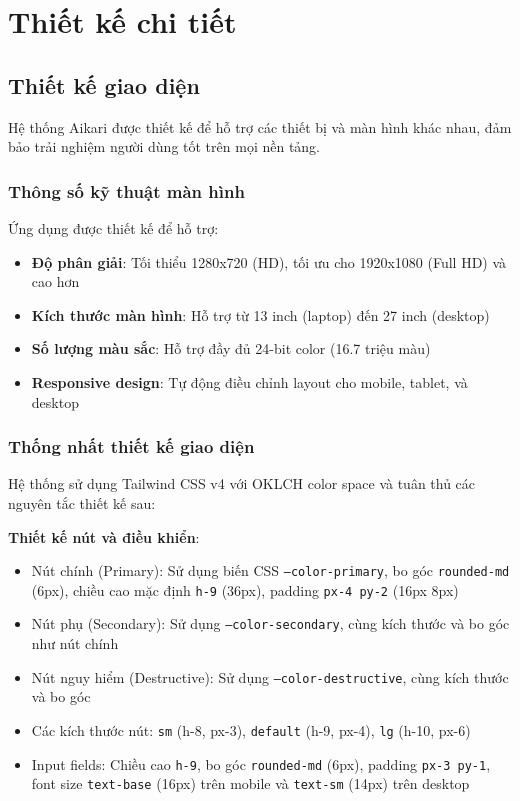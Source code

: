 \documentclass[../DoAn.tex]{subfiles}
\begin{document}
\section{Thiết kế chi tiết}
\label{section:4.2}

\subsection{Thiết kế giao diện}
\label{subsection:4.2.1}

Hệ thống Aikari được thiết kế để hỗ trợ các thiết bị và màn hình khác nhau, đảm bảo trải nghiệm người dùng tốt trên mọi nền tảng.

\subsubsection{Thông số kỹ thuật màn hình}

Ứng dụng được thiết kế để hỗ trợ:
\begin{itemize}
    \item \textbf{Độ phân giải}: Tối thiểu 1280x720 (HD), tối ưu cho 1920x1080 (Full HD) và cao hơn
    \item \textbf{Kích thước màn hình}: Hỗ trợ từ 13 inch (laptop) đến 27 inch (desktop)
    \item \textbf{Số lượng màu sắc}: Hỗ trợ đầy đủ 24-bit color (16.7 triệu màu)
    \item \textbf{Responsive design}: Tự động điều chỉnh layout cho mobile, tablet, và desktop
\end{itemize}

\subsubsection{Thống nhất thiết kế giao diện}

Hệ thống sử dụng Tailwind CSS v4 với OKLCH color space và tuân thủ các nguyên tắc thiết kế sau:

\textbf{Thiết kế nút và điều khiển}:
\begin{itemize}
    \item Nút chính (Primary): Sử dụng biến CSS \texttt{--color-primary}, bo góc \texttt{rounded-md} (6px), chiều cao mặc định \texttt{h-9} (36px), padding \texttt{px-4 py-2} (16px 8px)
    \item Nút phụ (Secondary): Sử dụng \texttt{--color-secondary}, cùng kích thước và bo góc như nút chính
    \item Nút nguy hiểm (Destructive): Sử dụng \texttt{--color-destructive}, cùng kích thước và bo góc
    \item Các kích thước nút: \texttt{sm} (h-8, px-3), \texttt{default} (h-9, px-4), \texttt{lg} (h-10, px-6)
    \item Input fields: Chiều cao \texttt{h-9}, bo góc \texttt{rounded-md} (6px), padding \texttt{px-3 py-1}, font size \texttt{text-base} (16px) trên mobile và \texttt{text-sm} (14px) trên desktop
\end{itemize}
\end{document}
